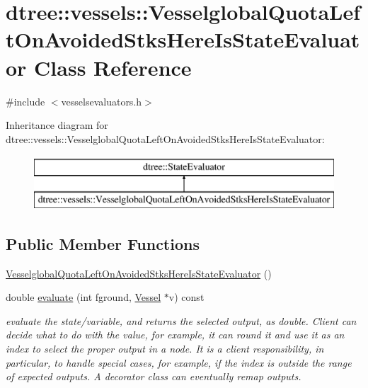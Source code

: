 \hypertarget{classdtree_1_1vessels_1_1_vesselglobal_quota_left_on_avoided_stks_here_is_state_evaluator}{}\section{dtree\+::vessels\+::Vesselglobal\+Quota\+Left\+On\+Avoided\+Stks\+Here\+Is\+State\+Evaluator Class Reference}
\label{classdtree_1_1vessels_1_1_vesselglobal_quota_left_on_avoided_stks_here_is_state_evaluator}


{\ttfamily \#include $<$vesselsevaluators.\+h$>$}

Inheritance diagram for dtree\+::vessels\+::Vesselglobal\+Quota\+Left\+On\+Avoided\+Stks\+Here\+Is\+State\+Evaluator\+:\begin{figure}[H]
\begin{center}
\leavevmode
\includegraphics[height=2.000000cm]{d9/d9b/classdtree_1_1vessels_1_1_vesselglobal_quota_left_on_avoided_stks_here_is_state_evaluator}
\end{center}
\end{figure}
\subsection*{Public Member Functions}
\begin{DoxyCompactItemize}
\item 
\mbox{\hyperlink{classdtree_1_1vessels_1_1_vesselglobal_quota_left_on_avoided_stks_here_is_state_evaluator_a131ba02b443193a4ce6547a44eceeb26}{Vesselglobal\+Quota\+Left\+On\+Avoided\+Stks\+Here\+Is\+State\+Evaluator}} ()
\item 
double \mbox{\hyperlink{classdtree_1_1vessels_1_1_vesselglobal_quota_left_on_avoided_stks_here_is_state_evaluator_a1a1659981d3f532ad0ebf39e589e8ebf}{evaluate}} (int fground, \mbox{\hyperlink{class_vessel}{Vessel}} $\ast$v) const
\begin{DoxyCompactList}\small\item\em evaluate the state/variable, and returns the selected output, as double. Client can decide what to do with the value, for example, it can round it and use it as an index to select the proper output in a node. It is a client responsibility, in particular, to handle special cases, for example, if the index is outside the range of expected outputs. A decorator class can eventually remap outputs. \end{DoxyCompactList}\end{DoxyCompactItemize}


